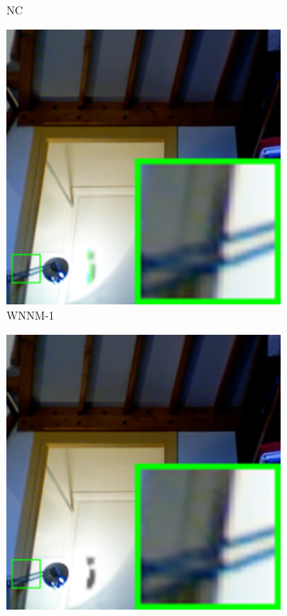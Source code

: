 \begin{figure}
\begin{subfigure}[t]{0.19\textwidth}
		\caption{NC}
    \end{subfigure}
    \hfill
    \begin{subfigure}[t]{0.19\textwidth}
        \centering
        \includegraphics[width=1\textwidth]{images/mcwnnm/nc/resize_br_WNNMcw_room.png}
		\caption{WNNM-1}
    \end{subfigure}
    \hfill
    \begin{subfigure}[t]{0.19\textwidth}
        \centering
        \includegraphics[width=1\textwidth]{images/mcwnnm/nc/resize_br_WNNMJ_room.png}

\end{subfigure}
\end{figure}
